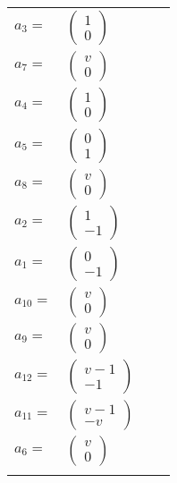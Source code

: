 \documentclass[1p]{elsarticle_modified}
\theoremstyle{definition}
\begin{document}
\begin{tabular}{m{7pt} m{180pt} m{7pt} m{180pt} }
\flushright $a_{3}=$&$\begin{pmatrix}1\\0\end{pmatrix}$ \\
\flushright $a_{7}=$&$\begin{pmatrix}v\\0\end{pmatrix}$ \\
\flushright $a_{4}=$&$\begin{pmatrix}1\\0\end{pmatrix}$ \\
\flushright $a_{5}=$&$\begin{pmatrix}0\\1\end{pmatrix}$ \\
\flushright $a_{8}=$&$\begin{pmatrix}v\\0\end{pmatrix}$ \\
\flushright $a_{2}=$&$\begin{pmatrix}1\\-1\end{pmatrix}$ \\
\flushright $a_{1}=$&$\begin{pmatrix}0\\-1\end{pmatrix}$ \\
\flushright $a_{10}=$&$\begin{pmatrix}v\\0\end{pmatrix}$ \\
\flushright $a_{9}=$&$\begin{pmatrix}v\\0\end{pmatrix}$ \\
\flushright $a_{12}=$&$\begin{pmatrix}v-1\\-1\end{pmatrix}$ \\
\flushright $a_{11}=$&$\begin{pmatrix}v-1\\- v\end{pmatrix}$ \\
\flushright $a_{6}=$&$\begin{pmatrix}v\\0\end{pmatrix}$\\&\end{tabular}
\end{document}
